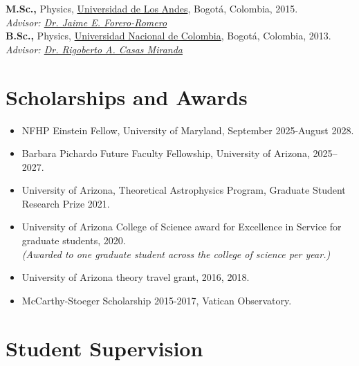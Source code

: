 \documentclass[14pt]{article}
\begin{document}
\textbf{M.Sc.,}  Physics, \href{https://fisica.uniandes.edu.co/en}{Universidad de Los Andes}, Bogot\'a, Colombia, 2015.\\
\indent \textit{Advisor: \href{http://wwwprof.uniandes.edu.co/~je.forero/}{Dr. Jaime E. Forero-Romero}}\\

\textbf{B.Sc.,} Physics,
\href{https://unal.edu.co/en.html}{Universidad Nacional de Colombia}, Bogot\'a, Colombia, 2013.\\
\indent \textit{Advisor:
\href{https://www.iau.org/administration/membership/individual/16146/}{Dr.
Rigoberto A. Casas Miranda}}



\section*{Scholarships and Awards}


\begin{itemize}
  \setlength\itemsep{0.0em}
  \renewcommand\labelitemi{$\cdot$}

\item NFHP Einstein Fellow, University of Maryland, September 2025-August 2028. 
\item Barbara Pichardo Future Faculty Fellowship, University of Arizona, 2025--2027. 
\item University of Arizona, Theoretical Astrophysics Program, Graduate Student
Research Prize 2021.
\item University of Arizona College of Science award for Excellence in
Service for graduate students, 2020.\\ 
\indent \textit{(Awarded to one graduate student across the college of
science per year.)}
\item University of Arizona theory travel grant, 2016, 2018. 
\item McCarthy-Stoeger Scholarship 2015-2017, Vatican Observatory.
\end{itemize}


\section*{Student Supervision}
\end{document}
